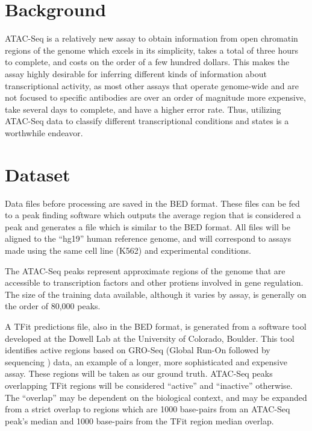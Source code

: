 \documentclass{article}
\begin{document}
\section{Background}
ATAC-Seq is a relatively new assay to obtain information from open chromatin
regions of the genome which excels in its simplicity, takes a total of three
hours to complete, and costs on the order of a few hundred dollars.  This makes
the assay highly desirable for inferring different kinds of information about
transcriptional activity, as most other assays that operate genome-wide and are
not focused to specific antibodies are over an order of magnitude more
expensive, take several days to complete, and have a higher error rate.  Thus,
utilizing ATAC-Seq data to classify different transcriptional conditions and
states is a worthwhile endeavor.

\section{Dataset}
Data files before processing are saved in the BED format.  These files can be
fed to a peak finding software which outputs the average region that is
considered a peak and generates a file which is similar to the BED format.  All
files will be aligned to the ``hg19'' human reference genome, and will
correspond to assays made using the same cell line (K562) and experimental
conditions.

The ATAC-Seq peaks represent approximate regions of the genome that are
accessible to transcription factors and other protiens involved in gene
regulation.  The size of the training data available, although it varies by
assay, is generally on the order of 80,000 peaks.

A TFit predictions file, also in the BED format, is generated from a software
tool developed at the Dowell Lab at the University of Colorado, Boulder.  This
tool identifies active regions based on GRO-Seq (Global Run-On
followed by sequencing \citep{gro}) data, an example of a longer, more sophisticated and
expensive assay.  These regions will be taken as our ground truth.  ATAC-Seq
peaks overlapping TFit regions will be considered ``active'' and ``inactive''
otherwise.  The ``overlap'' may be dependent on the biological context, and may
be expanded from a strict overlap to regions which are 1000 base-pairs from an
ATAC-Seq peak's median and 1000 base-pairs from the TFit region median overlap.
\end{document}
